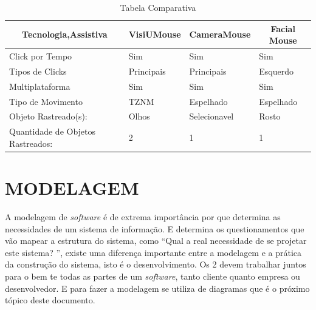\begin{table}[tbp]
\centering
\caption{Tabela Comparativa}
\label{tabela-comparativa}
\begin{tabular}{|l|l|l|l|}
\hline
\multicolumn{1}{|c|}{\textbf{Tecnologia,Assistiva}} & \multicolumn{1}{c|}{\textbf{VisiUMouse}} & \multicolumn{1}{c|}{\textbf{CameraMouse}} & \multicolumn{1}{c|}{\textbf{Facial Mouse}} \\ \hline
Click por Tempo                                     & \cellcolor[HTML]{67FD9A}Sim              & \cellcolor[HTML]{67FD9A}Sim                & \cellcolor[HTML]{67FD9A}Sim                \\ \hline
Tipos  de Clicks                                    & Principais                               & Principais                                 & Esquerdo                                   \\ \hline
Multiplataforma                                     & \cellcolor[HTML]{67FD9A}Sim              & \cellcolor[HTML]{67FD9A}Sim                & \cellcolor[HTML]{67FD9A}Sim                \\ \hline
Tipo de Movimento                                   & TZNM                                     & Espelhado                                  & Espelhado                                  \\ \hline
Objeto Rastreado(s):                                & Olhos                                    & Selecionavel                               & Rosto                                      \\ \hline
Quantidade de Objetos Rastreados:                   & 2                                        & 1                                          & 1                                          \\ \hline
\end{tabular}
\end{table}

\chapter{MODELAGEM}\label{CAP5}
A modelagem de \textit{software} é de extrema importância por que determina as necessidades de um sistema de informação. E determina os questionamentos que vão mapear a estrutura do sistema, como “Qual a real necessidade de se projetar este sistema? ”, existe uma diferença importante entre a modelagem e a prática da construção do sistema, isto é o desenvolvimento. Os 2 devem trabalhar juntos para o bem te todas as partes de um \textit{software}, tanto cliente quanto empresa ou desenvolvedor. E para fazer a modelagem se utiliza de diagramas que é o próximo tópico deste documento.

